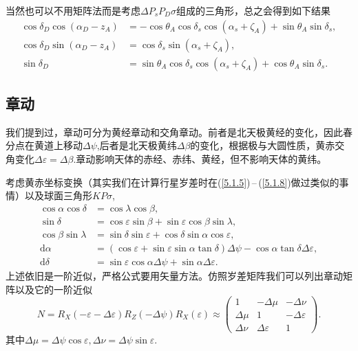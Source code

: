 \documentclass[11pt, a4paper, oneside]{ctexart}
\numberwithin{equation}{subsection}
\begin{document}
当然也可以不用矩阵法而是考虑$\Delta{}P_{s}P_{D}\sigma$组成的三角形，总之会得到如下结果
\begin{align}
\cos\delta_D\cos\left(\alpha_D-z_A\right)&=-\cos\theta_A\cos\delta_s\cos\left(\alpha_s+\zeta_A\right)+\sin\theta_A\sin\delta_s,\\
\cos\delta_D\sin\left(\alpha_D-z_A\right)&=\cos\delta_s\sin\left(\alpha_s+\zeta_A\right),\\
\sin\delta_D&=\sin\theta_A\cos\delta_s\cos\left(\alpha_s+\zeta_A\right)+\cos\theta_A\sin\delta_s.
\end{align}

\subsection{章动}
我们提到过，章动可分为黄经章动和交角章动。前者是北天极黄经的变化，因此春分点在黄道上移动$\Delta{}\psi$,后者是北天极黄纬$\Delta{}\beta$的变化，根据极与大圆性质，黄赤交角变化$\Delta{}\varepsilon=\Delta{}\beta$.章动影响天体的赤经、赤纬、黄经，但不影响天体的黄纬。

考虑黄赤坐标变换（其实我们在计算行星岁差时在(\ref{5.1.5})\,--\,(\ref{5.1.8})做过类似的事情）以及球面三角形$KP\sigma$,
\begin{align}
\cos\alpha\cos\delta&=\cos\lambda\cos\beta,\\
\sin\delta&=\cos\varepsilon\sin\beta+\sin\varepsilon\cos\beta\sin\lambda,\\
\cos\beta\sin\lambda&=\sin\delta\sin\varepsilon+\cos\delta\sin\alpha\cos\varepsilon,\\
\mathrm{d}\alpha&=\left(\cos\varepsilon+\sin\varepsilon\sin\alpha\tan\delta\right)\Delta\psi-\cos\alpha\tan\delta\Delta\varepsilon,\\
\mathrm{d}\delta&=\sin\varepsilon\cos\alpha\Delta\psi+\sin\alpha\Delta\varepsilon.
\end{align}
上述依旧是一阶近似，严格公式要用矢量方法。仿照岁差矩阵我们可以列出章动矩阵以及它的一阶近似
\begin{equation}
N=R_X\left(-\varepsilon-\Delta\varepsilon\right)R_Z\left(-\Delta\psi\right)R_X\left(\varepsilon\right)\approx\begin{pmatrix}
1 & -\Delta{}\mu & -\Delta{}\nu\\
\Delta{}\mu & 1 & -\Delta{}\varepsilon\\
\Delta{}\nu & \Delta{}\varepsilon & 1
\end{pmatrix}.
\end{equation}
其中$\Delta{}\mu=\Delta{}\psi\cos\varepsilon,\Delta{}\nu=\Delta{}\psi\sin\varepsilon$.
\end{document}
